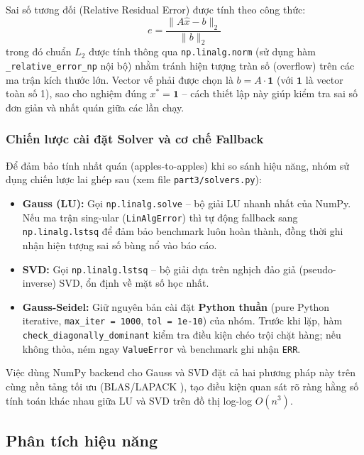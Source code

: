 Sai số tương đối (Relative Residual Error) được tính theo công thức:
\begin{equation}
    e = \frac{\|A\hat{x} - b\|_2}{\|b\|_2}
\end{equation}
trong đó chuẩn $L_2$ được tính thông qua \texttt{np.linalg.norm} \cite{numpy_docs} (sử dụng hàm \texttt{\_relative\_error\_np} nội bộ) nhằm tránh hiện tượng tràn số (overflow) trên các ma trận kích thước lớn. Vector vế phải được chọn là $b = A \cdot \mathbf{1}$ (với $\mathbf{1}$ là vector toàn số 1), sao cho nghiệm đúng $x^* = \mathbf{1}$ -- cách thiết lập này giúp kiểm tra sai số đơn giản và nhất quán giữa các lần chạy.

\subsubsection{Chiến lược cài đặt Solver và cơ chế Fallback}

Để đảm bảo tính nhất quán (apples-to-apples) khi so sánh hiệu năng, nhóm sử dụng chiến lược lai ghép sau (xem file \texttt{part3/solvers.py}):

\begin{itemize}
    \item \textbf{Gauss (LU):} Gọi \texttt{np.linalg.solve} -- bộ giải LU nhanh nhất của NumPy. Nếu ma trận sing-ular (\texttt{LinAlgError}) thì tự động fallback sang \texttt{np.linalg.lstsq} để đảm bảo benchmark luôn hoàn thành, đồng thời ghi nhận hiện tượng sai số bùng nổ vào báo cáo.
    \item \textbf{SVD:} Gọi \texttt{np.linalg.lstsq} -- bộ giải dựa trên nghịch đảo giả (pseudo-inverse) SVD, ổn định về mặt số học nhất.
    \item \textbf{Gauss-Seidel:} Giữ nguyên bản cài đặt \textbf{Python thuần} (pure Python iterative, \texttt{max\_iter = 1000}, \texttt{tol = 1e-10}) của nhóm. Trước khi lặp, hàm \texttt{check\_diagonally\_dominant} kiểm tra điều kiện chéo trội chặt hàng; nếu không thỏa, ném ngay \texttt{ValueError} và benchmark ghi nhận \texttt{ERR}.
\end{itemize}

Việc dùng NumPy backend cho Gauss và SVD đặt cả hai phương pháp này trên cùng nền tảng tối ưu (BLAS/LAPACK \cite{numpy_docs}), tạo điều kiện quan sát rõ ràng hằng số tính toán khác nhau giữa LU và SVD trên đồ thị log-log $O(n^3)$.

\subsection{Phân tích hiệu năng}

